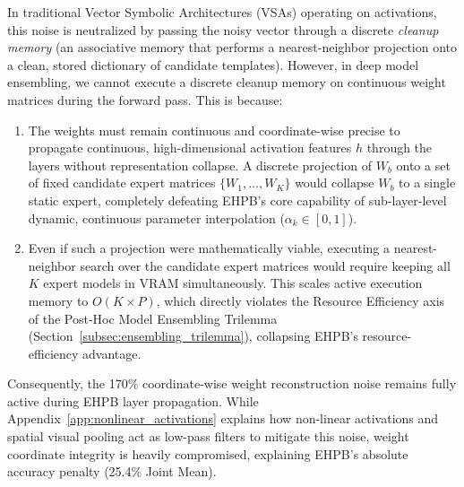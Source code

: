 \documentclass{article}
\theoremstyle{plain}
\theoremstyle{definition}
\theoremstyle{remark}
\begin{document}
In traditional Vector Symbolic Architectures (VSAs) operating on activations, this noise is neutralized by passing the noisy vector through a discrete \textit{cleanup memory} (an associative memory that performs a nearest-neighbor projection onto a clean, stored dictionary of candidate templates). However, in deep model ensembling, we cannot execute a discrete cleanup memory on continuous weight matrices during the forward pass. This is because:
\begin{enumerate}
\item The weights must remain continuous and coordinate-wise precise to propagate continuous, high-dimensional activation features $h$ through the layers without representation collapse. A discrete projection of $W_b$ onto a set of fixed candidate expert matrices $\{W_1, \dots, W_K\}$ would collapse $W_b$ to a single static expert, completely defeating EHPB's core capability of sub-layer-level dynamic, continuous parameter interpolation ($\alpha_k \in [0, 1]$).
\item Even if such a projection were mathematically viable, executing a nearest-neighbor search over the candidate expert matrices would require keeping all $K$ expert models in VRAM simultaneously. This scales active execution memory to $O(K \times P)$, which directly violates the Resource Efficiency axis of the Post-Hoc Model Ensembling Trilemma (Section~\ref{subsec:ensembling_trilemma}), collapsing EHPB's resource-efficiency advantage.
\end{enumerate}

Consequently, the 170\% coordinate-wise weight reconstruction noise remains fully active during EHPB layer propagation. While Appendix~\ref{app:nonlinear_activations} explains how non-linear activations and spatial visual pooling act as low-pass filters to mitigate this noise, weight coordinate integrity is heavily compromised, explaining EHPB's absolute accuracy penalty (25.4\% Joint Mean). 
\end{document}
